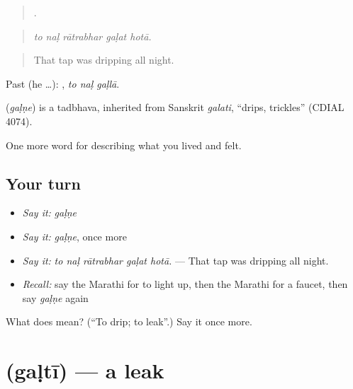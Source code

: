 \begin{quote}
    .
\end{quote}

\begin{quote}
\emph{to naḷ rātrabhar gaḷat hotā.}
\end{quote}

\begin{quote}
That tap was dripping all night.
\end{quote}

Past (he …):   , \emph{to naḷ gaḷlā}.

\begin{cousinweb}
\textbf{} (\emph{gaḷṇe}) is a tadbhava, inherited from Sanskrit \emph{galati}, \textquotedblleft{}drips, trickles\textquotedblright{} (CDIAL 4074).
\end{cousinweb}

\begin{grammarlens}[title={What you've built}]
One more word for describing what you lived and felt.
\end{grammarlens}

\subsection*{Your turn}
\begin{itemize}
\raggedright
  \item \emph{Say it:} \emph{gaḷṇe}
  \item \emph{Say it:} \emph{gaḷṇe}, once more
  \item \emph{Say it:} \emph{to naḷ rātrabhar gaḷat hotā.} — That tap was dripping all night.
  \item \emph{Recall:} say the Marathi for to light up, then the Marathi for a faucet, then say \emph{gaḷṇe} again
\end{itemize}

\begin{tcolorbox}[breakable,colback=teal!4,colframe=teal!35!black,title={Before you move on}]
What does  mean? (\textquotedblleft{}To drip; to leak\textquotedblright{}.) Say it once more.
\end{tcolorbox}
\section[\texorpdfstring{\mr{गळती} (gaḷtī)}{गळती (gaḷtī)}]{ (gaḷtī) — a leak}

\label{lesson:MR-C520-galti}



